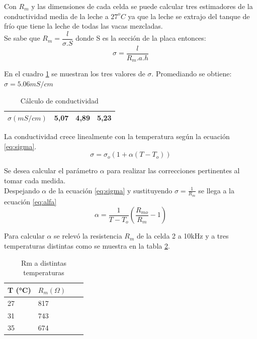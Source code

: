 Con $R_{m}$ y las dimensiones de cada celda se puede calcular tres estimadores de la conductividad media de la leche a $27^{o}C$ ya que la leche se extrajo del tanque de  frío que tiene la leche de todas las vacas mezcladas.\\

Se sabe que $R_{m}=\dfrac{l}{\sigma .S}$ donde S es la sección de la placa entonces:\\

\begin{equation}
\sigma=\dfrac{l}{R_{m}.a.h}
\end{equation}

En el cuadro \ref{tabla:sigma} se muestran los tres valores de $\sigma$. Promediando se obtiene: $\sigma=5.06 mS/cm$
\begin{table}[htb]

\centering
\caption{Cálculo de conductividad}
\label{tabla:sigma}
\begin{tabular}{|l|l|l|l|}
\hline
$\sigma (mS/cm)$ &5,07 & 4,89 &5,23\\ \hline

\end{tabular}

\end{table}

La conductividad crece linealmente con la temperatura según la ecuación \ref{eq:sigma}.\\

\begin{equation}
\sigma=\sigma_{o}(1+\alpha(T-T_{o}))
\label{eq:sigma}
\end{equation}

Se desea calcular el parámetro $\alpha$ para realizar las correcciones pertinentes al tomar cada medida.\\

Despejando $\alpha$ de la ecuación \ref{eq:sigma} y sustituyendo $\sigma =\frac{1}{R_{m}}$ se llega a la ecuación \ref{eq:alfa}\\

\begin{equation}
\alpha=\dfrac{1}{T-T_{o}}\left(\dfrac{R_{mo}}{R_{m}}-1\right)
\label{eq:alfa}
\end{equation}

Para calcular $\alpha$ se relevó la resistencia $R_{m}$ de la celda 2 a 10kHz y a tres temperaturas distintas como se muestra en la tabla \ref{tabla:alfa}.

\begin{table}[htb]

\centering
\caption{Rm a distintas temperaturas}
\label{tabla:alfa}
\begin{tabular}{|l|l|l|l|}
\hline
T (°C)& $R_{m}(\Omega)$ \\ \hline
 27& 817 \\ \hline
 31& 743 \\ \hline
 35& 674 \\ \hline
\end{tabular}

\end{table}

